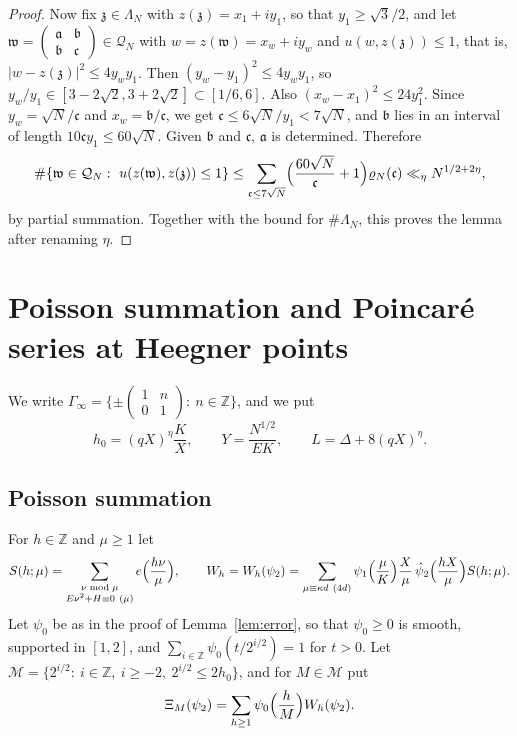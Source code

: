\documentclass[11pt]{amsart}
\theoremstyle{remark}
\theoremstyle{definition}
\numberwithin{equation}{section}
\newcommand{\Qc}{\mathcal{Q}}
\newcommand{\Mset}{\mathcal{M}}
\newcommand{\Z}{\mathbb{Z}}
\newcommand{\ga}{\mathfrak{a}}
\newcommand{\gb}{\mathfrak{b}}
\newcommand{\gc}{\mathfrak{c}}
\newcommand{\gz}{\mathfrak{z}}
\newcommand{\gw}{\mathfrak{w}}
\begin{document}
\begin{proof}
Now fix $\gz\in\Lambda_N$ with $z(\gz)=x_1+iy_1$, so that $y_1\ge\sqrt3/2$, and let $\gw=\left(\begin{smallmatrix}\ga&\gb\\ \gb&\gc\end{smallmatrix}\right)\in\Qc_N$ with $w=z(\gw)=x_w+iy_w$ and $u(w,z(\gz))\le1$, that is, $|w-z(\gz)|^2\le4y_wy_1$. Then $(y_w-y_1)^2\le4y_wy_1$, so $y_w/y_1\in[3-2\sqrt2,3+2\sqrt2]\subset[1/6,6]$. Also $(x_w-x_1)^2\le24y_1^2$. Since $y_w=\sqrt N/\gc$ and $x_w=\gb/\gc$, we get $\gc\le6\sqrt N/y_1<7\sqrt N$, and $\gb$ lies in an interval of length $10\gc y_1\le60\sqrt N$. Given $\gb$ and $\gc$, $\ga$ is determined. Therefore
\[
\#\{\gw\in\Qc_N:\ u(z(\gw),z(\gz))\le1\}\le\sum_{\gc\le7\sqrt N}\Bigl(\frac{60\sqrt N}{\gc}+1\Bigr)\varrho_N(\gc)\ll_\eta N^{1/2+2\eta},
\]
by partial summation. Together with the bound for $\#\Lambda_N$, this proves the lemma after renaming $\eta$.
\end{proof}

\section{Poisson summation and Poincar\'e series at Heegner points}\label{sec:poisson}

We write $\Gamma_\infty=\{\pm\left(\begin{smallmatrix}1&n\\0&1\end{smallmatrix}\right):\ n\in\Z\}$, and we put
\begin{equation}\label{eq:params}
h_0=(qX)^\eta\frac KX,\qquad Y=\frac{N^{1/2}}{EK},\qquad L=\Delta+8(qX)^\eta.
\end{equation}

\subsection{Poisson summation}
For $h\in\Z$ and $\mu\ge1$ let
\[
S(h;\mu)=\sum_{\substack{\nu\bmod\mu\\ E\nu^2+H\equiv0\ (\mu)}}e\Bigl(\frac{h\nu}\mu\Bigr),\qquad W_h=W_h(\psi_2)=\sum_{\mu\equiv\kappa d\ (4d)}\psi_1\Bigl(\frac\mu K\Bigr)\frac X\mu\,\hat\psi_2\Bigl(\frac{hX}\mu\Bigr)S(h;\mu).
\]
Let $\psi_0$ be as in the proof of Lemma~\ref{lem:error}, so that $\psi_0\ge0$ is smooth, supported in $[1,2]$, and $\sum_{i\in\Z}\psi_0(t/2^{i/2})=1$ for $t>0$. Let $\Mset=\{2^{i/2}:\ i\in\Z,\ i\ge-2,\ 2^{i/2}\le2h_0\}$, and for $M\in\Mset$ put
\[
\Xi_M(\psi_2)=\sum_{h\ge1}\psi_0\Bigl(\frac hM\Bigr)W_h(\psi_2).
\]
\end{document}
